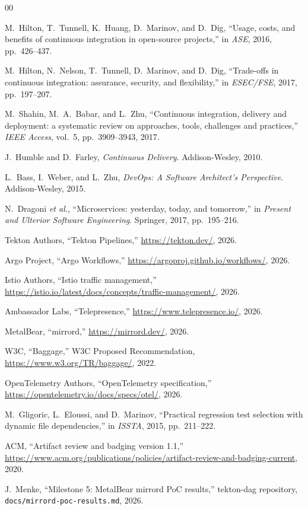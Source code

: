 \documentclass[10pt,conference]{IEEEtran}
\begin{document}
\begin{thebibliography}{00}

M.~Hilton, T.~Tunnell, K.~Huang, D.~Marinov, and D.~Dig, ``Usage, costs, and benefits of continuous integration in open-source projects,'' in \emph{ASE}, 2016, pp.~426--437.

M.~Hilton, N.~Nelson, T.~Tunnell, D.~Marinov, and D.~Dig, ``Trade-offs in continuous integration: assurance, security, and flexibility,'' in \emph{ESEC/FSE}, 2017, pp.~197--207.

M.~Shahin, M.~A.~Babar, and L.~Zhu, ``Continuous integration, delivery and deployment: a systematic review on approaches, tools, challenges and practices,'' \emph{IEEE Access}, vol.~5, pp.~3909--3943, 2017.

J.~Humble and D.~Farley, \emph{Continuous Delivery}. Addison-Wesley, 2010.

L.~Bass, I.~Weber, and L.~Zhu, \emph{DevOps: A Software Architect's Perspective}. Addison-Wesley, 2015.

N.~Dragoni \emph{et al.}, ``Microservices: yesterday, today, and tomorrow,'' in \emph{Present and Ulterior Software Engineering}. Springer, 2017, pp.~195--216.

Tekton Authors, ``Tekton Pipelines,'' \url{https://tekton.dev/}, 2026.

Argo Project, ``Argo Workflows,'' \url{https://argoproj.github.io/workflows/}, 2026.

Istio Authors, ``Istio traffic management,'' \url{https://istio.io/latest/docs/concepts/traffic-management/}, 2026.

Ambassador Labs, ``Telepresence,'' \url{https://www.telepresence.io/}, 2026.

MetalBear, ``mirrord,'' \url{https://mirrord.dev/}, 2026.

W3C, ``Baggage,'' W3C Proposed Recommendation, \url{https://www.w3.org/TR/baggage/}, 2022.

OpenTelemetry Authors, ``OpenTelemetry specification,'' \url{https://opentelemetry.io/docs/specs/otel/}, 2026.

M.~Gligoric, L.~Eloussi, and D.~Marinov, ``Practical regression test selection with dynamic file dependencies,'' in \emph{ISSTA}, 2015, pp.~211--222.

ACM, ``Artifact review and badging version 1.1,'' \url{https://www.acm.org/publications/policies/artifact-review-and-badging-current}, 2020.

J.~Menke, ``Milestone 5: MetalBear mirrord PoC results,'' tekton-dag repository, \texttt{docs/mirrord-poc-results.md}, 2026.

\end{thebibliography}
\end{document}
